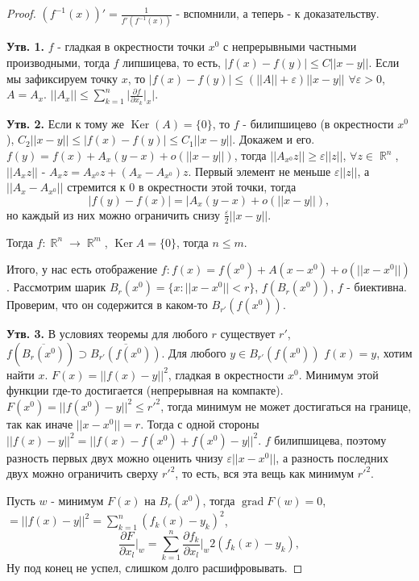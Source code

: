 \documentclass[a4paper,100pt]{article}
\theoremstyle{indented}
\theoremstyle{definition}
\theoremstyle{remark}
\DeclareMathOperator{\Ker}{Ker}
\DeclareMathOperator{\RR}{\mathbb{R}}
\DeclareMathOperator{\grad}{grad}
\begin{document}
\begin{proof}
    $(f^{-1}(x))' = \frac{1}{f'(f^{-1}(x))}$ - вспомнили, а теперь - к доказательству. \ 

    \textbf{Утв. 1.} $f$ - гладкая в окрестности точки $x^0$ с непрерывными частными производными, тогда $f$ липшицева, то есть, $|f(x)-f(y)|\leq C||x-y||$. Если мы зафиксируем точку $x$, то $|f(x)-f(y)|\leq(||A||+\varepsilon)||x-y||$ $\forall \varepsilon >0$, $A=A_x$. $||A_x||\leq\sum_{k=1}^n\bigg|\frac{\partial f}{\partial x_k}\bigg|_x\bigg|$. \ 

    \textbf{Утв. 2.} Если к тому же $\Ker (A)=\{0\}$, то $f$ - билипшицево (в окрестности $x^0$), $C_2||x-y||\leq |f(x)-f(y)|\leq C_1||x-y||$. Докажем и его. $f(y)= f(x)+A_x(y-x)+o(||x-y||)$, тогда $||A_{x^0}z||\geq \varepsilon ||z||$, $\forall z\in \RR^n$, $||A_xz||$ - $A_xz= A_{x^0}z+(A_x-A_{x^0})z$. Первый элемент не меньше $\varepsilon ||z||$, а $||A_x-A_{x^0}||$ стремится к 0 в окрестности этой точки, тогда 
    \[
        |f(y)-f(x)|=|A_x(y-x)+o(||x-y||),
    \]
    но каждый из них можно ограничить снизу $\frac{\varepsilon}{2}||x-y||$. \ 

    Тогда $f:\RR^n\rightarrow \RR^m$, $\Ker A= \{0\}$, тогда $n\leq m$. \ 

    Итого, у нас есть отображение $f:f(x)=f(x^0)+A(x-x^0)+o(||x-x^0||)$. Рассмотрим шарик $B_r(x^0)=\{x:||x-x^0||<r\}$, $f(B_r(x^0))$, $f$ - биективна. Проверим, что он содержится в каком-то $B_{r'}(f(x^0))$. \ 

    \textbf{Утв. 3.} В условиях теоремы для любого $r$ существует $r'$, $f(\overline{B_r(x^0)})\supset \overline{B_{r'}(f(x^0))}$. Для любого $y\in B_{r'}(f(x^0))$ $f(x)=y$, хотим найти $x$. $F(x)= ||f(x)-y||^2$, гладкая в окрестности $x^0$. Минимум этой функции где-то достигается (непрерывная на компакте). $F(x^0)= ||f(x^0)-y||^2\leq r'^2$, тогда минимум не может достигаться на границе, так как иначе $||x-x^0||=r$. Тогда с одной стороны $||f(x)-y||^2=||f(x)-f(x^0)+f(x^0)-y||^2$. $f$ билипшицева, поэтому разность первых двух можно оценить чнизу $\varepsilon||x-x^0||$, а разность последних двух можно ограничить сверху $r'^2$, то есть, вся эта вещь как минимум $r'^2$. \ 

    Пусть $w$ - минимум $F(x)$ на $B_r(x^0)$, тогда $\grad F(w)=0$,  $=||f(x)-y||^2 = \sum_{k=1}^n(f_k(x)-y_k)^2$, 
    \[
        \frac{\partial F}{\partial x_l}\bigg|_w = \sum_{k=1}^n\frac{\partial f_k}{\partial x_l}\bigg|_w 2(f_k(x)-y_k), 
    \]
    Ну под конец не успел, слишком долго расшифровывать.
\end{proof}
\end{document}
